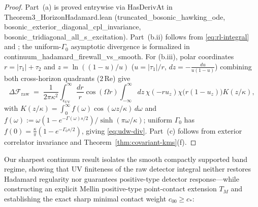 \documentclass[11pt,a4paper]{article}
\theoremstyle{definition}
\theoremstyle{remark}
\newcommand{\cF}{\mathcal{F}}
\newcommand{\1}{\mathbf{1}}
\newcommand{\code}[1]{{\scriptsize\ttfamily #1}}
\begin{document}
\begin{proof}
Part~(a) is proved entrywise via \code{HasDerivAt} in \code{Theorem3\_\allowbreak Horizon\allowbreak Hadamard.\allowbreak lean} (\code{truncated\_\allowbreak bosonic\_\allowbreak hawking\_\allowbreak ode}, \code{bosonic\_\allowbreak exter\allowbreak ior\_\allowbreak diag\allowbreak onal\_\allowbreak cpl\_\allowbreak invar\allowbreak iance}, \code{bosonic\_\allowbreak tri\allowbreak diag\allowbreak onal\_\allowbreak all\_\allowbreak s\_\allowbreak exci\allowbreak tation}). Part~(b.ii) follows from \eqref{eq:rl-integral} and \cite{Radzikowski1996,Sanders2015}; the uniform-$\Gamma_0$ asymptotic divergence is formalized in \code{contin\allowbreak uum\_\allowbreak hada\allowbreak mard\_\allowbreak fire\allowbreak wall\_\allowbreak vs\_\allowbreak smooth}. For (b.iii), polar coordinates $r=|\tau_1|+\tau_2$ and $z=\ln((1-u)/u)$ ($u=|\tau_1|/r$, $dz=-\frac{du}{u(1-u)}$) combining both cross-horizon quadrants ($2\,\mathrm{Re}$) give
\[
  \Delta\cF_{\mathrm{raw}} \;=\; \frac{1}{2\pi\kappa^2}\int_{\epsilon_{\mathrm{UV}}}^\infty\frac{dr}{r}\cos(\Omega r)\int_{-\infty}^\infty dz\,\chi(-ru_z)\chi\bigl(r(1-u_z)\bigr)K(z/\kappa),
\]
with $K(z/\kappa)=\int_0^\infty f(\omega)\cos(\omega z/\kappa)\,d\omega$ and $f(\omega):=\omega(1-e^{-\Gamma(\omega)s/2})/\sinh(\pi\omega/\kappa)$; uniform $\Gamma_0$ has $f(0)=\frac{\kappa}{\pi}(1-e^{-\Gamma_0 s/2})$, giving \eqref{eq:udw-div}. Part~(c) follows from exterior correlator invariance and Theorem~\ref{thm:covariant-kms}(f).
\end{proof}

Our sharpest continuum result isolates the smooth compactly supported band regime, showing that UV finiteness of the raw detector integral neither restores Hadamard regularity nor guarantees positive-type detector response---while constructing an explicit Mellin positive-type point-contact extension $T_M$ and establishing the exact sharp minimal contact weight $c_{00}\ge c_*$:
\end{document}
